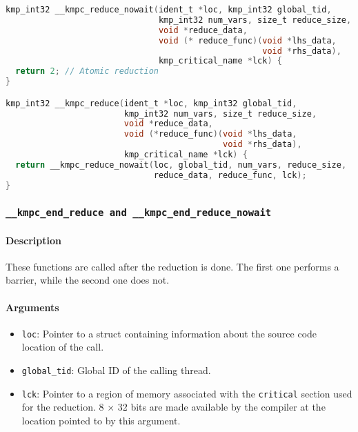 \begin{lstlisting}[language=C, caption={__kmpc_reduce and __kmpc_reduce_nowait},
                   label={lst:kmpc-reduce}, escapechar=@]
kmp_int32 __kmpc_reduce_nowait(ident_t *loc, kmp_int32 global_tid,
                               kmp_int32 num_vars, size_t reduce_size,
                               void *reduce_data,
                               void (* reduce_func)(void *lhs_data,
                                                    void *rhs_data),
                               kmp_critical_name *lck) {
  return 2; // Atomic reduction
}

kmp_int32 __kmpc_reduce(ident_t *loc, kmp_int32 global_tid,
                        kmp_int32 num_vars, size_t reduce_size,
                        void *reduce_data,
                        void (*reduce_func)(void *lhs_data,
                                            void *rhs_data),
                        kmp_critical_name *lck) {
  return __kmpc_reduce_nowait(loc, global_tid, num_vars, reduce_size,
                              reduce_data, reduce_func, lck);
}
\end{lstlisting}

\subsubsection{\texttt{__kmpc_end_reduce and __kmpc_end_reduce_nowait}}
\label{subsubsec:kmpc-end-reduce}

\paragraph{Description} These functions are called after the reduction is done. The first one
performs a barrier, while the second one does not.

\paragraph{Arguments}
\begin{itemize}
	\item \texttt{loc}: Pointer to a struct containing information about the source code location
	      of the call.
	\item \texttt{global_tid}: Global ID of the calling thread.
	\item \texttt{lck}: Pointer to a region of memory associated with the \texttt{critical} section
	      used for the reduction. 8 $\times$ 32 bits are made available by the compiler at the
	      location pointed to by this argument.
\end{itemize}

